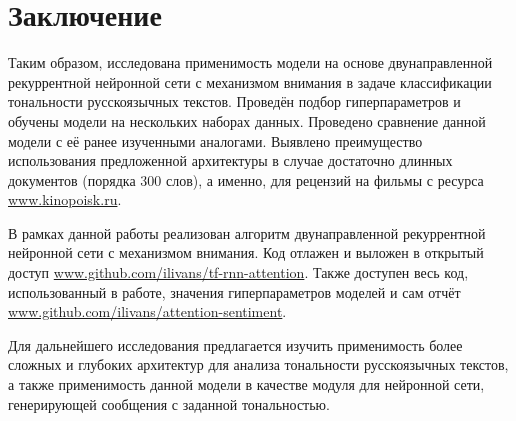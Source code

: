 \chapter{Заключение}

Таким образом, исследована применимость модели на основе двунаправленной рекуррентной нейронной сети с механизмом внимания в задаче классификации тональности русскоязычных текстов. Проведён подбор гиперпараметров и обучены модели на нескольких наборах данных. Проведено сравнение данной модели с её ранее изученными аналогами. Выявлено преимущество использования предложенной архитектуры в случае достаточно длинных документов (порядка 300 слов), а именно, для рецензий на фильмы с ресурса \url{www.kinopoisk.ru}.

В рамках данной работы реализован алгоритм двунаправленной рекуррентной нейронной сети с механизмом внимания. Код отлажен и выложен в открытый доступ \url{www.github.com/ilivans/tf-rnn-attention}. Также доступен весь код, использованный в работе, значения гиперпараметров моделей и сам отчёт \url{www.github.com/ilivans/attention-sentiment}.

Для дальнейшего исследования предлагается изучить применимость более сложных и глубоких архитектур для анализа тональности русскоязычных текстов, а также применимость данной модели в качестве модуля для нейронной сети, генерирующей сообщения с заданной тональностью.

